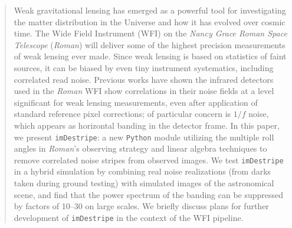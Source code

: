 \documentclass[]{pasj01}
\newcommand{\Katherine}[1]{{\textcolor{ForestGreen}{\bfseries{[#1]}}}}
\newcommand{\Chris}[1]{{\textcolor{red}{\bfseries{[#1]}}}}
\begin{document}
\begin{abstract}
Weak gravitational lensing has emerged as a powerful tool for investigating the matter distribution in the Universe and how it has evolved over cosmic time. The Wide Field Instrument (WFI) on the \textit{Nancy Grace Roman Space Telescope} (\textit{Roman}) will deliver some of the highest precision measurements of weak lensing ever made. Since weak lensing is based on statistics of faint sources, it can be biased by even tiny instrument systematics, including correlated read noise. Previous works have shown the infrared detectors used in the \textit{Roman} WFI show correlations in their noise fields at a level significant for weak lensing measurements, even after application of standard reference pixel corrections; of particular concern is $1/f$ noise, which appears as horizontal banding in the detector frame. In this paper, we present \texttt{imDestripe}: a new \texttt{Python} module utilizing the multiple roll angles in \textit{Roman}'s observing strategy and linear algebra techniques to remove correlated noise stripes from observed images. We test \texttt{imDestripe} in a hybrid simulation by combining real noise realizations (from darks taken during ground testing) with simulated images of the astronomical scene, and find that the power spectrum of the banding can be suppressed by factors of 10--30 on large scales. We briefly discuss plans for further development of \texttt{imDestripe} in the context of the WFI pipeline.

\end{abstract}
\end{document}
